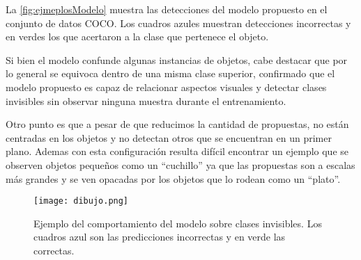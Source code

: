 La \autoref{fig:ejmeplosModelo} muestra las detecciones del modelo propuesto en el conjunto de datos COCO. Los cuadros azules muestran detecciones incorrectas y en verdes los que acertaron a la clase que pertenece el objeto. 

Si bien el modelo confunde algunas instancias de objetos, cabe destacar que por lo general se equivoca dentro de una misma clase superior, confirmado que el modelo propuesto es capaz de relacionar aspectos visuales y detectar clases invisibles sin observar ninguna muestra durante el entrenamiento. 

Otro punto es que a pesar de que reducimos la cantidad de propuestas, no están centradas en los objetos y no detectan otros que se encuentran en un primer plano. Ademas con esta configuración resulta difícil encontrar un ejemplo que se observen objetos pequeños como  un ``cuchillo'' ya que las propuestas son a escalas más grandes y se ven opacadas por los objetos que lo rodean como un ``plato''.

\begin{figure}[]
	\texttt{[image: dibujo.png]}
	\caption{Ejemplo del comportamiento del modelo sobre clases invisibles. Los cuadros azul son las predicciones incorrectas y en verde las correctas.}
	\label{fig:ejmeplosModelo}
\end{figure}
